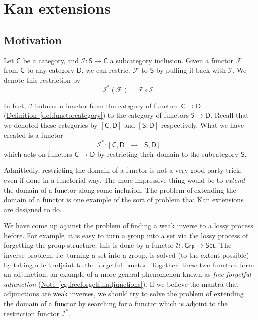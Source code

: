 \documentclass[notes.tex]{subfiles}
\begin{document}
\chapter{Kan extensions}
\label{sec:kan_extensions}

\section{Motivation}
\label{sec:kan_extensions_motivation}

Let $\mathsf{C}$ be a category, and $\mathcal{I}\colon \mathsf{S} \to \mathsf{C}$ a subcategory inclusion. Given a functor $\mathcal{F}$ from $\mathsf{C}$ to any category $\mathsf{D}$, we can restrict $\mathcal{F}$ to $\mathsf{S}$ by pulling it back with $\mathcal{I}$. We denote this restriction by
\begin{equation*}
  \mathcal{I}^{*}(\mathcal{F}) = \mathcal{F} \circ \mathcal{I}.
\end{equation*}

In fact, $\mathcal{I}$ induces a functor from the category of functors $\mathsf{C} \to \mathsf{D}$ (\hyperref[def:functorcategory]{Definition~\ref*{def:functorcategory}}) to the category of functors $\mathsf{S} \to \mathsf{D}$. Recall that we denoted these categories by $[\mathsf{C}, \mathsf{D}]$ and $[\mathsf{S}, \mathsf{D}]$ respectively. What we have created is a functor
\begin{equation*}
  \mathcal{I}^{*}\colon [\mathsf{C}, \mathsf{D}] \to [\mathsf{S}, \mathsf{D}]
\end{equation*}
which acts on functors $\mathsf{C} \to \mathsf{D}$ by restricting their domain to the subcategory $\mathsf{S}$.

Admittedly, restricting the domain of a functor is not a very good party trick, even if done in a functorial way. The more impressive thing would be to \emph{extend} the domain of a functor along some inclusion. The problem of extending the domain of a functor is one example of the sort of problem that Kan extensions are designed to do.

We have come up against the problem of finding a weak inverse to a lossy process before. For example, it is easy to turn a group into a set via the lossy process of forgetting the group structure; this is done by a functor $\mathcal{U}\colon \mathsf{Grp} \to \mathsf{Set}$. The inverse problem, i.e. turning a set into a group, is solved (to the extent possible) by taking a left adjoint to the forgetful functor. Together, these two functors form an adjunction, an example of a more general phenomenon known as \emph{free-forgetful adjunction} (\hyperref[eg:freeforgetfuladjunctions]{Note~\ref*{eg:freeforgetfuladjunctions}}). If we believe the mantra that adjunctions are weak inverses, we should try to solve the problem of extending the domain of a functor by searching for a functor which is adjoint to the restriction functor $\mathcal{I}^{*}$.
\end{document}
